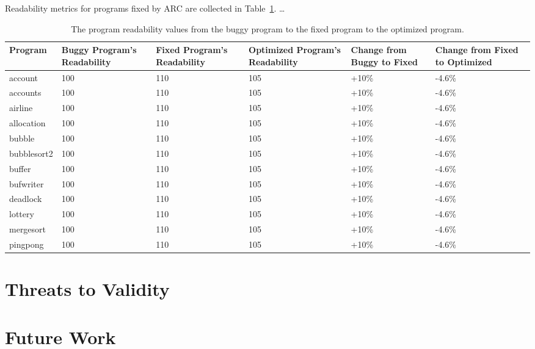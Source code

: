 \documentclass{llncs}
\begin{document}
Readability metrics for programs fixed by ARC are collected in
Table~\ref{tbl:readability}.
\ldots %

\begin{table}[!t]
\caption{The program readability values from the buggy program to the fixed
program to the optimized program.}
\begin{center}
\begin{tabular}{|l|p{2cm}|p{2cm}|p{2cm}|p{2cm}|p{2cm}|}
\hline
\textbf{Program} & \textbf{Buggy Program's Readability} & \textbf{Fixed Program's Readability} & \textbf{Optimized Program's Readability} & \textbf{Change from Buggy to Fixed} & \textbf{Change from Fixed to Optimized}\\
\hline
account & 100 & 110 & 105 & +10\% & -4.6\%\\
\hline
accounts & 100 & 110 & 105 & +10\% & -4.6\%\\
\hline
airline & 100 & 110 & 105 & +10\% & -4.6\%\\
\hline
allocation & 100 & 110 & 105 & +10\% & -4.6\%\\
\hline
bubble & 100 & 110 & 105 & +10\% & -4.6\%\\
\hline
bubblesort2 & 100 & 110 & 105 & +10\% & -4.6\%\\
\hline
buffer & 100 & 110 & 105 & +10\% & -4.6\%\\
\hline
bufwriter & 100 & 110 & 105 & +10\% & -4.6\%\\
\hline
deadlock & 100 & 110 & 105 & +10\% & -4.6\%\\
\hline
lottery & 100 & 110 & 105 & +10\% & -4.6\%\\
\hline
mergesort & 100 & 110 & 105 & +10\% & -4.6\%\\
\hline
pingpong & 100 & 110 & 105 & +10\% & -4.6\%\\
\hline
\end{tabular}
\label{tbl:readability}
\end{center}
\end{table}

\section{Threats to Validity}
\label{sec:threats}


\section{Future Work}
\label{sec:future_work}
\end{document}
